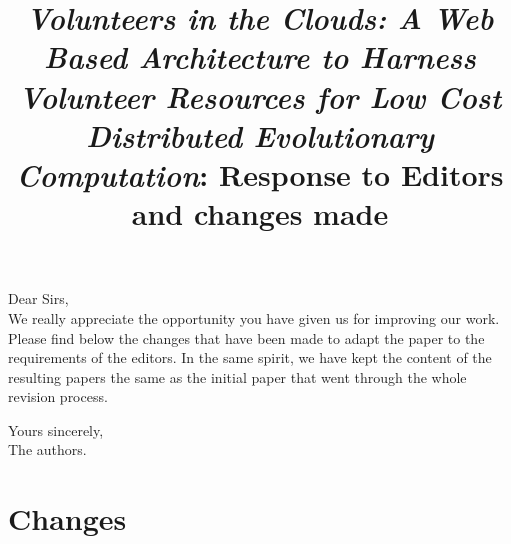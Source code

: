 \documentclass[preprint]{elsarticle}
\begin{document}

\title{{\em Volunteers in the Clouds: A Web Based Architecture to Harness Volunteer Resources 
for Low Cost Distributed Evolutionary Computation}: Response to
Editors and changes made}

\noindent
Dear Sirs,\\

We really appreciate the opportunity you have given us for improving
our work. Please find below the changes that have been made to adapt
the paper to the requirements of the editors. In the same spirit, we
have kept the content of the resulting papers the same as the initial
paper that went through the whole revision process. 

\noindent
Yours sincerely,\\
The authors.

\section{Changes}




\end{document}
